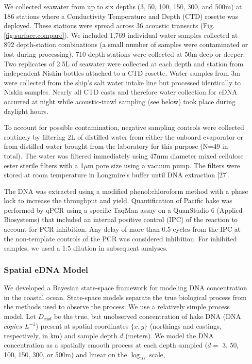 \documentclass[
]{article}
\begin{document}
We collected seawater from up to six depths (3, 50, 100, 150, 300, and
500m) at 186 stations where a Conductivity Temperature and Depth (CTD)
rosette was deployed. These stations were spread across 36 acoustic
transects (Fig. \ref{fig:surface.compare}). We included 1,769 individual
water samples collected at 892 depth-station combinations (a small
number of samples were contaminated or lost during processing). 710
depth-stations were collected at 50m deep or deeper. Two replicates of
2.5L of seawater were collected at each depth and station from
independent Niskin bottles attached to a CTD rosette. Water samples from
3m were collected from the ship's salt water intake line but processed
identically to Niskin samples. Nearly all CTD casts and therefore water
collection for eDNA occurred at night while acoustic-trawl sampling (see
below) took place during daylight hours.

To account for possible contamination, negative sampling controls were
collected routinely by filtering 2L of distilled water from either the
onboard evaporator or from distilled water brought from the laboratory
for this purpose (N=49 in total). The water was filtered immediately
using 47mm diameter mixed cellulose ester sterile
filters with a 1\(\mu\)m pore size using a vacuum pump. The filters
were stored at room temperature in Longmire's buffer until DNA
extraction {[}27{]}.

The DNA was extracted using a modified phenol:chloroform method with a
phase lock to increase the throughput and yield. Quantification of
Pacific hake was performed by qPCR using a specific TaqMan assay on a
QuanStudio 6 (Applied Biosystems) that included an internal positive
control (IPC) of the reaction to account for PCR inhibition. Any delay of more 
than 0.5 cycles from the IPC at the non-template controls of the PCR was 
considered inhibition. For inhibited samples, we used a 1:5 dilution in subsequent analyses.

\hypertarget{spatial-edna-model}{%
\subsubsection{Spatial eDNA Model}\label{spatial-edna-model}}

We developed a Bayesian state-space framework for modeling DNA
concentration in the coastal ocean. State-space models separate the true
biological process from the methods used to observe the process. We use
a relatively simple process model. Let \(D_{xyd}\) be the true, but
unobserved concentration of hake DNA (DNA \(copies\) \(L^{-1}\)) present
at spatial coordinates \(\{x,y\}\) (northings and eastings,
respectively, in km) and sample depth \(d\) (meters). We model the DNA
concentration as a spatially smooth process at each depth sampled
(\(d =\) 3, 50, 100, 150, 300, or 500m) and linear on the \(\log_{10}\)
scale,
\end{document}
